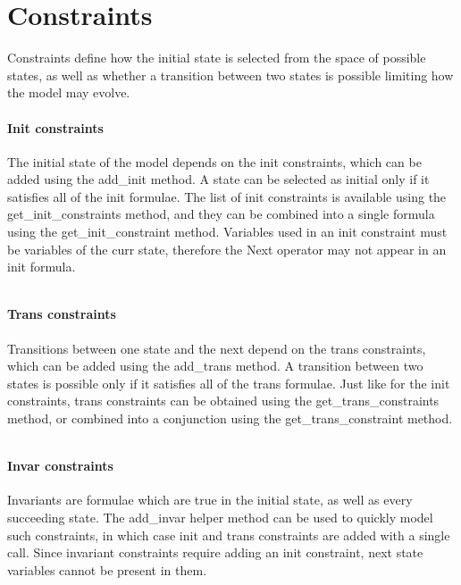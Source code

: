 \inputminted[firstline=21, lastline=31]{python}{py/modelling.py}

\section{Constraints}
Constraints define how the initial state is selected from the space of possible states, as well as whether a transition between two states is possible limiting how the model may evolve.

\paragraph*{Init constraints}
The initial state of the model depends on the init constraints, which can be added using the add\_init method.
A state can be selected as initial only if it satisfies all of the init formulae.
The list of init constraints is available using the get\_init\_constraints method, and they can be combined into a single formula using the get\_init\_constraint method.
Variables used in an init constraint must be variables of the curr state, therefore the Next operator may not appear in an init formula.

\inputminted[firstline=33, lastline=38]{python}{py/modelling.py}

\paragraph*{Trans constraints}
Transitions between one state and the next depend on the trans constraints, which can be added using the add\_trans method.
A transition between two states is possible only if it satisfies all of the trans formulae.
Just like for the init constraints, trans constraints can be obtained using the get\_trans\_constraints method, or combined into a conjunction using the get\_trans\_constraint method.

\inputminted[firstline=40, lastline=63]{python}{py/modelling.py}

\paragraph*{Invar constraints}
Invariants are formulae which are true in the initial state, as well as every succeeding state.
The add\_invar helper method can be used to quickly model such constraints, in which case init and trans constraints are added with a single call.
Since invariant constraints require adding an init constraint, next state variables cannot be present in them.

